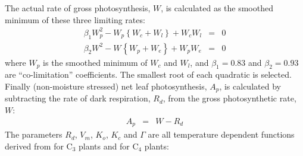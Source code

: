 \documentclass[a4paper]{article}
\begin{document}
The actual rate of gross photosynthesis, $W$, is calculated as the
smoothed minimum of these three limiting rates:
\begin{eqnarray}
\beta_{1} W_{p}^{2} - W_{p} \left\{W_{c} + W_{l} \right\} + W_{c} W_{l} &=& 0 \\
\beta_{2} W_{}^{2} - W_{} \left\{W_{p} + W_{e} \right\} + W_{p} W_{e} &=& 0
\end{eqnarray}
where $W_{p}$ is the smoothed minimum of $W_{c}$ and $W_{l}$, and
$\beta_{1}=0.83$ and $\beta_{2}=0.93$ are ``co-limitation''
coefficients. The smallest root of each quadratic is selected. Finally
(non-moisture stressed) net leaf photosynthesis, $A_{p}$, is
calculated by subtracting the rate of dark respiration, $R_{d}$, from
the gross photosynthetic rate, $W$:
\begin{eqnarray}
A_{p} &=& W - R_{d}
\end{eqnarray}
The parameters $R_{d}$, $V_{m}$, $K_{o}$, $K_{c}$ and $\Gamma$ are all
temperature dependent functions derived from \citet{Col91} for
C$_{3}$ plants and \citet{Col92} for C$_{4}$ plants:
\end{document}
